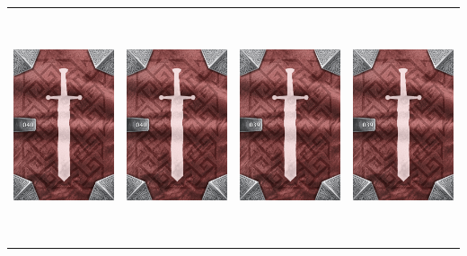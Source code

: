 \documentclass{minimal}
\begin{document}
{\begin{longtable}{llll}
\includegraphics[width=44mm,height=68mm]{./36-42/gh-040-versatile-dagger-back.png} &
\includegraphics[width=44mm,height=68mm]{./36-42/gh-040-versatile-dagger-back.png} &
\includegraphics[width=44mm,height=68mm]{./36-42/gh-039-hooked-chain-back.png} &
\includegraphics[width=44mm,height=68mm]{./36-42/gh-039-hooked-chain-back.png}\\ 

\end{longtable}}
\end{document}
